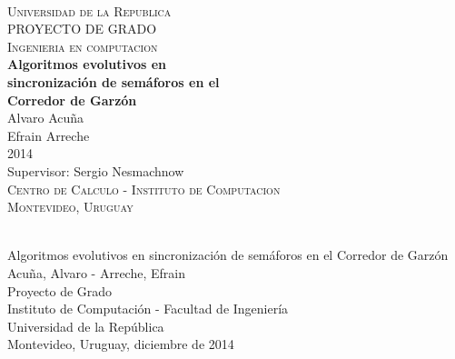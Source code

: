 \begin{titlepage}
  \thispagestyle{empty}
  \begin{center}
    ~\\[2.2cm]



    \textsc{\Huge Universidad de la Republica } \\[2.5cm]
    \textsc{\Huge PROYECTO DE GRADO } \\[0.5cm]
    \textsc{\Huge Ingenieria en computacion } \\[2.5cm]    
    \textbf{\Huge Algoritmos evolutivos en } \\[0.2cm]
    \textbf{\Huge sincronización de semáforos en el } \\[0.3cm]
    \textbf{\Huge Corredor de Garzón } \\[1.5cm]    
    
    {\huge Alvaro Acuña} \\[0.2cm]
    {\huge Efrain Arreche} \\[0.2cm]
    {\Large 2014} \\[2.0cm]
    {\Large Supervisor: Sergio Nesmachnow} \\[1.0cm]

    \textsc{\large Centro de Calculo - Instituto de Computacion} \\[0.2cm]
    \textsc{\large Montevideo, Uruguay} \\[1.5cm]

  \end{center}
  \vfill
\end{titlepage}
{
  \thispagestyle{empty}
  ~\\[16cm]
  Algoritmos evolutivos en sincronización de semáforos en el Corredor de Garzón \\[0.05cm]
  Acuña, Alvaro - Arreche, Efrain \\[0.05cm]
  Proyecto de Grado \\[0.05cm]
  Instituto de Computación - Facultad de Ingeniería \\[0.05cm]
  Universidad de la República \\[0.05cm]
  Montevideo, Uruguay, diciembre de 2014 \\[0.05cm]
  \vfill
  \cleardoublepage
}
\setcounter{page}{1}